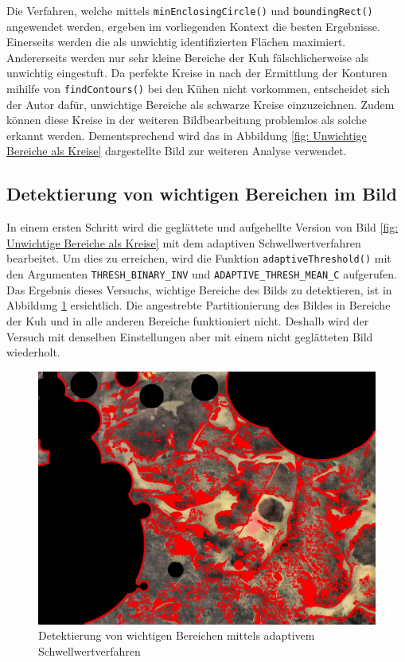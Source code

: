 Die Verfahren, welche mittels \texttt{minEnclosingCircle()} und \texttt{boundingRect()} angewendet werden, ergeben im vorliegenden Kontext die besten Ergebnisse. Einerseits werden die als unwichtig identifizierten Flächen  maximiert. Andererseits werden nur sehr kleine Bereiche der Kuh fälschlicherweise als unwichtig eingestuft. Da perfekte Kreise in nach der Ermittlung der Konturen mihilfe von \texttt{findContours()} bei den Kühen nicht vorkommen, entscheidet sich der Autor dafür, unwichtige Bereiche als schwarze Kreise einzuzeichnen. Zudem können diese Kreise in der weiteren Bildbearbeitung problemlos als solche erkannt werden.
Dementsprechend wird das in Abbildung \ref{fig: Unwichtige Bereiche als Kreise} dargestellte Bild zur weiteren Analyse verwendet.
\subsection{Detektierung von wichtigen Bereichen im Bild}



In einem ersten Schritt wird die geglättete und aufgehellte Version von Bild \ref{fig: Unwichtige Bereiche als Kreise} mit dem adaptiven Schwellwertverfahren bearbeitet. Um dies zu erreichen, wird die Funktion \texttt{adaptiveThreshold()} mit den Argumenten \texttt{THRESH_BINARY_INV} und \texttt{ADAPTIVE_THRESH_MEAN_C} aufgerufen. Das Ergebnis dieses Versuchs, wichtige Bereiche des Bilds zu detektieren, ist in Abbildung \ref{fig: Detektierung von wichtigen Bereichen mittels adaptivem Schwellwertverfahren} ersichtlich. Die angestrebte Partitionierung des Bildes in Bereiche der Kuh und in alle anderen Bereiche funktioniert nicht. Deshalb wird der Versuch mit denselben Einstellungen aber mit einem nicht geglätteten Bild wiederholt.

\begin{figure}[H]
	\center
	\includegraphics[scale=0.43]{Grafiken/entwicklung/10thresholdedEqualizedBirghtened.jpg}
	\caption{Detektierung von wichtigen Bereichen mittels adaptivem Schwellwertverfahren} 
	\label{fig: Detektierung von wichtigen Bereichen mittels adaptivem Schwellwertverfahren} 
\end{figure}

